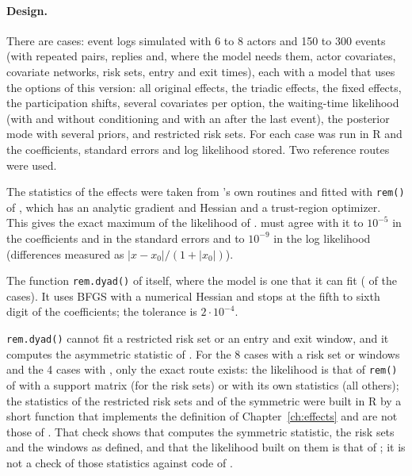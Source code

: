 \paragraph{Design.} There are \nvalcases{} cases: event logs simulated with 6 to 8 actors and 150 to 300 events (with repeated pairs, replies and, where the model needs them, actor covariates, covariate networks, risk sets, entry and exit times), each with a model that uses the options of this version: all original effects, the triadic effects, the fixed effects, the participation shifts, several covariates per option, the waiting-time likelihood (with and without conditioning and with an  after the last event), the posterior mode with several priors, and restricted risk sets. For each case \relevent{} was run in R and the coefficients, standard errors and log likelihood stored. Two reference routes were used.
\begin{description}[nosep]
  \item[Exact route.] The statistics of the effects were taken from \relevent{}'s own routines and fitted with \texttt{rem()} of \relevent{}, which has an analytic gradient and Hessian and a trust-region optimizer. This gives the exact maximum of the likelihood of \relevent{}. \nwrem{} must agree with it to $10^{-5}$ in the coefficients and in the standard errors and to $10^{-9}$ in the log likelihood (differences measured as $|x-x_0|/(1+|x_0|)$).
  \item[\texttt{rem.dyad()}.] The function \texttt{rem.dyad()} of \relevent{} itself, where the model is one that it can fit (\nvaldyad{} of the \nvalcases{} cases). It uses BFGS with a numerical Hessian and stops at the fifth to sixth digit of the coefficients; the tolerance is $2\cdot10^{-4}$.
\end{description}
\texttt{rem.dyad()} cannot fit a restricted risk set or an entry and exit window, and it computes the asymmetric statistic of . For the 8 cases with a risk set or windows and the 4 cases with , only the exact route exists: the likelihood is that of \texttt{rem()} of \relevent{} with a support matrix (for the risk sets) or with its own statistics (all others); the statistics of the restricted risk sets and of the symmetric  were built in R by a short function that implements the definition of Chapter~\ref{ch:effects} and are not those of \relevent{}. That check shows that \nwrem{} computes the symmetric statistic, the risk sets and the windows as defined, and that the likelihood built on them is that of \relevent{}; it is not a check of those statistics against code of \relevent{}.

